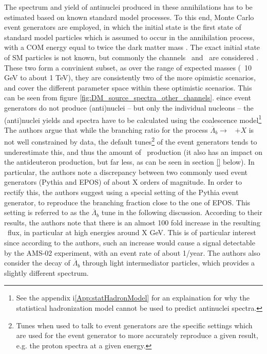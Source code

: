 The spectrum and yield of antinuclei produced in these annihilations has to be estimated based on known standard model processes. To this end, Monte Carlo event generators are employed\cite{}, in which the initial state is the first state of standard model particles which is assumed to occur in the annihilation process, with a COM energy equal to twice the dark matter mass \dmm \cite{cookbook}.%
The exact initial state of SM particles is not known, but commonly the channels \WW\ and \bb\ are considered \cite{}. These two form a convinient subset, as over the range of expected masses (~10 GeV to about 1 TeV), they are consistently two of the more opimistic scenarios, and cover the different parameter space within these optimistic scenarios\cite{}. This can be seen from figure \ref{fig:DM_source_spectra_other_channels}. 
eince event generators do not produce (anti)nuclei -- but only the individual nucleons -- the (anti)nuclei yields and spectra have to be calculated using the coalescence model\footnote{See the appendix i\ref{App:statHadronModel} for an explaination for why the statistical hadronization model cannot be used to predict antinuclei spectra.}
The authors argue that while the branching ratio for the process $\overline{\Lambda}_b \rightarrow $ \ahe\ $+X$ is not well constrained by data, the default tunes\footnote{Tunes when used to talk to event generators are the specific settings which are used for the event generator to more accurately reproduce a given result, e.g. the proton spectra at a given energy.} of the event generators tends to underestimate this, and thus the amount of \ahe\ production (it also has an impact on the antideuteron production, but far less, as can be seen in section \ref{} below). In particular, the authors note a discrepancy between two commonly used event generators (Pythia\cite{} and EPOS\cite{}) of about X orders of magnitude. In order to rectify this, the authors suggest using a special setting of the Pythia event generator, to reproduce the branching fraction close to the one of EPOS. This setting is referred to as the $\overline{\Lambda}_b$ tune in the following discussion. According to their results, the authors note that there is an almost 100 fold increase in the resulting \ahe\ flux, in particular at high energies around X GeV. This is of particular interest since according to the authors, such an increase would cause a signal detectable by the AMS-02 experiment, with an event rate of about 1/year.  The authors also consider the decay of $\overline{\Lambda}_b$ through light intermediator particles, which provides a slightly different spectrum.\\
